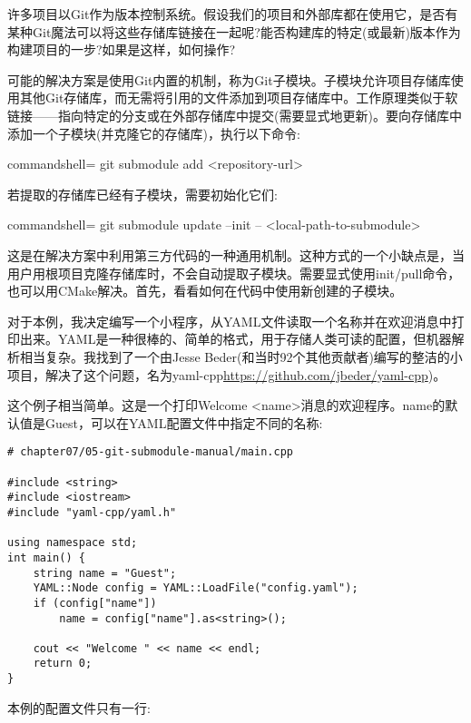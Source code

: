 
许多项目以Git作为版本控制系统。假设我们的项目和外部库都在使用它，是否有某种Git魔法可以将这些存储库链接在一起呢?能否构建库的特定(或最新)版本作为构建项目的一步?如果是这样，如何操作?


可能的解决方案是使用Git内置的机制，称为Git子模块。子模块允许项目存储库使用其他Git存储库，而无需将引用的文件添加到项目存储库中。工作原理类似于软链接——指向特定的分支或在外部存储库中提交(需要显式地更新)。要向存储库中添加一个子模块(并克隆它的存储库)，执行以下命令:

\begin{tcblisting}{commandshell={}}
git submodule add <repository-url>
\end{tcblisting}

若提取的存储库已经有子模块，需要初始化它们:

\begin{tcblisting}{commandshell={}}
git submodule update --init -- <local-path-to-submodule>
\end{tcblisting}

这是在解决方案中利用第三方代码的一种通用机制。这种方式的一个小缺点是，当用户用根项目克隆存储库时，不会自动提取子模块。需要显式使用init/pull命令，也可以用CMake解决。首先，看看如何在代码中使用新创建的子模块。

对于本例，我决定编写一个小程序，从YAML文件读取一个名称并在欢迎消息中打印出来。YAML是一种很棒的、简单的格式，用于存储人类可读的配置，但机器解析相当复杂。我找到了一个由Jesse Beder(和当时92个其他贡献者)编写的整洁的小项目，解决了这个问题，名为yaml-cpp\url{https://github.com/jbeder/yaml-cpp})。

这个例子相当简单。这是一个打印Welcome <name>消息的欢迎程序。name的默认值是Guest，可以在YAML配置文件中指定不同的名称:

\begin{lstlisting}[style=styleCMake]
# chapter07/05-git-submodule-manual/main.cpp

#include <string>
#include <iostream>
#include "yaml-cpp/yaml.h"

using namespace std;
int main() {
	string name = "Guest";
	YAML::Node config = YAML::LoadFile("config.yaml");
	if (config["name"])
		name = config["name"].as<string>();
	
	cout << "Welcome " << name << endl;
	return 0;
}
\end{lstlisting}

本例的配置文件只有一行:

